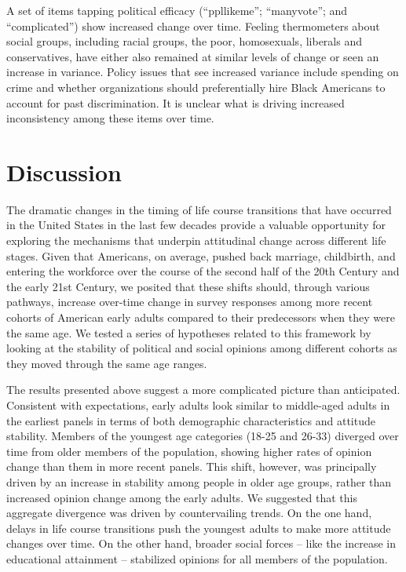 \documentclass[
  12pt,
]{article}
\begin{document}
A set of items tapping political efficacy (``ppllikeme''; ``manyvote''; and ``complicated'') show increased change over time. Feeling thermometers about social groups, including racial groups, the poor, homosexuals, liberals and conservatives, have either also remained at similar levels of change or seen an increase in variance. Policy issues that see increased variance include spending on crime and whether organizations should preferentially hire Black Americans to account for past discrimination. It is unclear what is driving increased inconsistency among these items over time.

\hypertarget{discussion}{%
\section{Discussion}\label{discussion}}

The dramatic changes in the timing of life course transitions that have occurred in the United States in the last few decades provide a valuable opportunity for exploring the mechanisms that underpin attitudinal change across different life stages. Given that Americans, on average, pushed back marriage, childbirth, and entering the workforce over the course of the second half of the 20th Century and the early 21st Century, we posited that these shifts should, through various pathways, increase over-time change in survey responses among more recent cohorts of American early adults compared to their predecessors when they were the same age. We tested a series of hypotheses related to this framework by looking at the stability of political and social opinions among different cohorts as they moved through the same age ranges.

The results presented above suggest a more complicated picture than anticipated. Consistent with expectations, early adults look similar to middle-aged adults in the earliest panels in terms of both demographic characteristics and attitude stability. Members of the youngest age categories (18-25 and 26-33) diverged over time from older members of the population, showing higher rates of opinion change than them in more recent panels. This shift, however, was principally driven by an increase in stability among people in older age groups, rather than increased opinion change among the early adults. We suggested that this aggregate divergence was driven by countervailing trends. On the one hand, delays in life course transitions push the youngest adults to make more attitude changes over time. On the other hand, broader social forces -- like the increase in educational attainment -- stabilized opinions for all members of the population.
\end{document}
